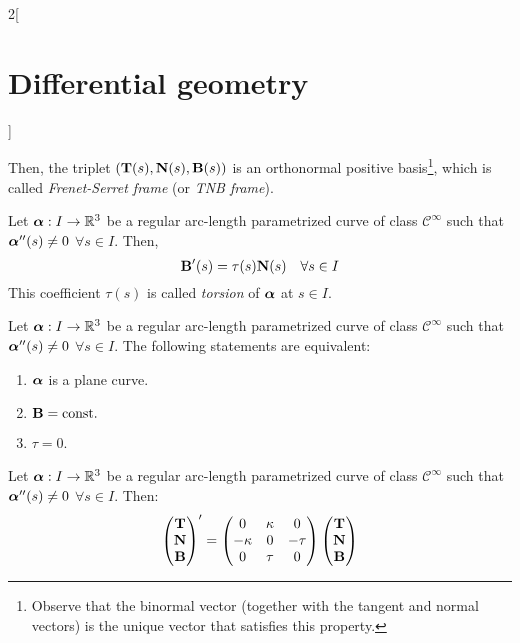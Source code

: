 \documentclass[../../../main.tex]{subfiles}
\begin{document}
\begin{multicols}{2}[\section{Differential geometry}]
\begin{definition}
    Then, the triplet $(\boldsymbol{\mathrm{T}}(s),\boldsymbol{\mathrm{N}}(s),\boldsymbol{\mathrm{B}}(s))$ is an orthonormal positive basis\footnote{Observe that the binormal vector (together with the tangent and normal vectors) is the unique vector that satisfies this property.}, which is called \emph{Frenet-Serret frame} (or \emph{TNB frame}).
  \end{definition}
  \begin{prop}
    Let $\boldsymbol{\mathrm{\alpha}}:I\rightarrow\mathbb{R}^3$ be a regular arc-length parametrized curve of class $\mathcal{C}^\infty$ such that $\boldsymbol{\mathrm{\alpha}}''(s)\ne 0$ $\forall s\in I$. Then, $$\boldsymbol{\mathrm{B}}'(s)=\tau(s)\boldsymbol{\mathrm{N}}(s)\quad\forall s\in I$$ This coefficient $\tau(s)$ is called \emph{torsion} of $\boldsymbol{\mathrm{\alpha}}$ at $s\in I$.
  \end{prop}
  \begin{prop}
    Let $\boldsymbol{\mathrm{\alpha}}:I\rightarrow\mathbb{R}^3$ be a regular arc-length parametrized curve of class $\mathcal{C}^\infty$ such that $\boldsymbol{\mathrm{\alpha}}''(s)\ne 0$ $\forall s\in I$. The following statements are equivalent:
    \begin{enumerate}
      \item $\boldsymbol{\mathrm{\alpha}}$ is a plane curve.
      \item $\boldsymbol{\mathrm{B}}=\text{const.}$
      \item $\tau=0$.
    \end{enumerate}
  \end{prop}
  \begin{theorem}
    Let $\boldsymbol{\mathrm{\alpha}}:I\rightarrow\mathbb{R}^3$ be a regular arc-length parametrized curve of class $\mathcal{C}^\infty$ such that $\boldsymbol{\mathrm{\alpha}}''(s)\ne 0$ $\forall s\in I$. Then:
    $$
      \begin{pmatrix}
        \boldsymbol{\mathrm{T}} \\
        \boldsymbol{\mathrm{N}} \\
        \boldsymbol{\mathrm{B}} \\
      \end{pmatrix}'=
      \begin{pmatrix}
        0       & \kappa & 0     \\
        -\kappa & 0      & -\tau \\
        0       & \tau   & 0
      \end{pmatrix}
      \begin{pmatrix}
        \boldsymbol{\mathrm{T}} \\
        \boldsymbol{\mathrm{N}} \\
        \boldsymbol{\mathrm{B}} \\
      \end{pmatrix}
    $$
  \end{theorem}

\end{multicols}
\end{document}
